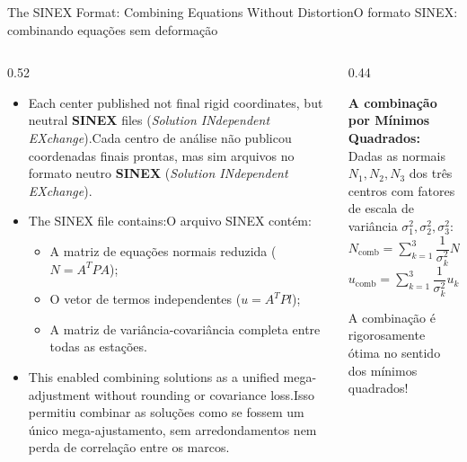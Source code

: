 \documentclass[aspectratio=169,11pt]{beamer}
\newcommand{\tr}[2]{\ifEN#2\else#1\fi}
\begin{document}
\begin{frame}{\tr{O formato SINEX: combinando equações sem deformação}{The SINEX Format: Combining Equations Without Distortion}}
  \begin{columns}[onlytextwidth]
    \begin{column}{0.52\textwidth}
      \begin{itemize}
        \setlength{\itemsep}{4pt}
        \scriptsize
        \item \tr{Cada centro de análise não publicou coordenadas finais prontas, mas sim arquivos
              no formato neutro \textbf{SINEX} (\emph{Solution INdependent EXchange}).}{Each center
              published not final rigid coordinates, but neutral \textbf{SINEX} files (\emph{Solution
              INdependent EXchange}).}
        \item \tr{O arquivo SINEX contém:}{The SINEX file contains:}
              \begin{itemize}
                \tiny
                \item A matriz de equações normais reduzida ($N = A^T P A$);
                \item O vetor de termos independentes ($u = A^T P l$);
                \item A matriz de variância-covariância completa entre todas as estações.
              \end{itemize}
        \item \tr{Isso permitiu combinar as soluções como se fossem um único mega-ajustamento, sem
              arredondamentos nem perda de correlação entre os marcos.}{This enabled combining solutions
              as a unified mega-adjustment without rounding or covariance loss.}
      \end{itemize}
    \end{column}
    \begin{column}{0.44\textwidth}
      \begin{regra}
        \scriptsize
        \tr{\textbf{A combinação por Mínimos Quadrados:}\\[3pt]
        Dadas as normais $N_1, N_2, N_3$ dos três centros com fatores de escala de variância
        $\sigma_1^2, \sigma_2^2, \sigma_3^2$:\\[4pt]
        \centering
        $N_{\text{comb}} = \sum_{k=1}^3 \dfrac{1}{\sigma_k^2} N_k$\\[4pt]
        $u_{\text{comb}} = \sum_{k=1}^3 \dfrac{1}{\sigma_k^2} u_k$\\[4pt]
        \raggedright
        A combinação é rigorosamente ótima no sentido dos mínimos quadrados!}{
}
\end{regra}
\end{column}
\end{columns}
\end{frame}
\end{document}
